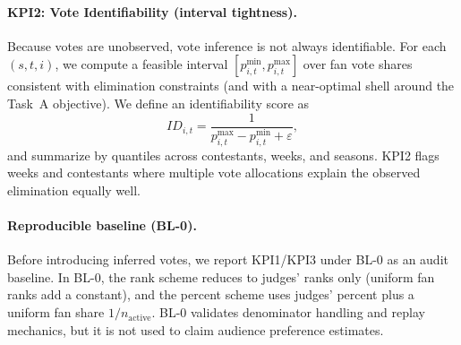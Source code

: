 \paragraph{KPI2: Vote Identifiability (interval tightness).}
Because votes are unobserved, vote inference is not always identifiable.\cite{benning2018regularization,kaipio2005statistical} For each $(s,t,i)$, we compute a feasible interval
$[p^{\min}_{i,t},p^{\max}_{i,t}]$ over fan vote shares consistent with elimination constraints (and with a near-optimal shell
around the Task~A objective). We define an identifiability score as
\begin{equation}
ID_{i,t}=\frac{1}{p^{\max}_{i,t}-p^{\min}_{i,t}+\varepsilon},
\end{equation}
and summarize by quantiles across contestants, weeks, and seasons. KPI2 flags weeks and contestants where multiple vote
allocations explain the observed elimination equally well.

\paragraph{Reproducible baseline (BL-0).}
Before introducing inferred votes, we report KPI1/KPI3 under BL-0 as an audit baseline. In BL-0, the rank scheme reduces to
judges' ranks only (uniform fan ranks add a constant), and the percent scheme uses judges' percent plus a uniform fan share
$1/n_{\text{active}}$. BL-0 validates denominator handling and replay mechanics, but it is not used to claim audience preference estimates.
